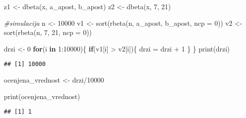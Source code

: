 \documentclass[
]{article}
\newenvironment{Shaded}{\begin{snugshade}}{\end{snugshade}}
\newcommand{\AttributeTok}[1]{\textcolor[rgb]{0.77,0.63,0.00}{#1}}
\newcommand{\CommentTok}[1]{\textcolor[rgb]{0.56,0.35,0.01}{\textit{#1}}}
\newcommand{\ControlFlowTok}[1]{\textcolor[rgb]{0.13,0.29,0.53}{\textbf{#1}}}
\newcommand{\DecValTok}[1]{\textcolor[rgb]{0.00,0.00,0.81}{#1}}
\newcommand{\FunctionTok}[1]{\textcolor[rgb]{0.00,0.00,0.00}{#1}}
\newcommand{\NormalTok}[1]{#1}
\newcommand{\OtherTok}[1]{\textcolor[rgb]{0.56,0.35,0.01}{#1}}
\newcommand{\SpecialCharTok}[1]{\textcolor[rgb]{0.00,0.00,0.00}{#1}}
\begin{document}
\begin{Shaded}
\begin{Highlighting}[]
\NormalTok{z1 }\OtherTok{\textless{}{-}} \FunctionTok{dbeta}\NormalTok{(x, a\_apost, b\_apost)}
\NormalTok{z2 }\OtherTok{\textless{}{-}} \FunctionTok{dbeta}\NormalTok{(x, }\DecValTok{7}\NormalTok{, }\DecValTok{21}\NormalTok{)}

  
\CommentTok{\#simulacija}
\NormalTok{n }\OtherTok{\textless{}{-}} \DecValTok{10000}
\NormalTok{v1 }\OtherTok{\textless{}{-}} \FunctionTok{sort}\NormalTok{(}\FunctionTok{rbeta}\NormalTok{(n, a\_apost, b\_apost, }\AttributeTok{ncp =} \DecValTok{0}\NormalTok{))}
\NormalTok{v2 }\OtherTok{\textless{}{-}} \FunctionTok{sort}\NormalTok{(}\FunctionTok{rbeta}\NormalTok{(n, }\DecValTok{7}\NormalTok{, }\DecValTok{21}\NormalTok{, }\AttributeTok{ncp =} \DecValTok{0}\NormalTok{))}

\NormalTok{drzi }\OtherTok{\textless{}{-}} \DecValTok{0} 
\ControlFlowTok{for}\NormalTok{(i }\ControlFlowTok{in} \DecValTok{1}\SpecialCharTok{:}\DecValTok{10000}\NormalTok{)\{}
  \ControlFlowTok{if}\NormalTok{(v1[i] }\SpecialCharTok{\textgreater{}}\NormalTok{ v2[i])\{}
\NormalTok{    drzi }\OtherTok{=}\NormalTok{ drzi }\SpecialCharTok{+} \DecValTok{1}
\NormalTok{  \}}
\NormalTok{\}}
\FunctionTok{print}\NormalTok{(drzi)}
\end{Highlighting}
\end{Shaded}

\begin{verbatim}
## [1] 10000
\end{verbatim}

\begin{Shaded}
\begin{Highlighting}[]
\NormalTok{ocenjena\_vrednost }\OtherTok{\textless{}{-}}\NormalTok{ drzi}\SpecialCharTok{/}\DecValTok{10000}

\FunctionTok{print}\NormalTok{(ocenjena\_vrednost)}
\end{Highlighting}
\end{Shaded}

\begin{verbatim}
## [1] 1
\end{verbatim}
\end{document}
